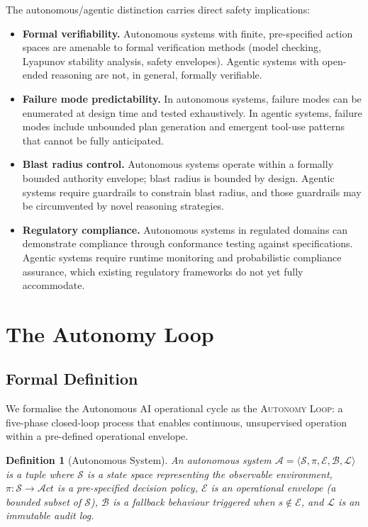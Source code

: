 \documentclass[12pt, a4paper]{article}
\newtheorem{definition}{Definition}
\begin{document}
The autonomous/agentic distinction carries direct safety implications:

\begin{itemize}
    \item \textbf{Formal verifiability.} Autonomous systems with finite, pre-specified action spaces are amenable to formal verification methods (model checking, Lyapunov stability analysis, safety envelopes). Agentic systems with open-ended reasoning are not, in general, formally verifiable.
    \item \textbf{Failure mode predictability.} In autonomous systems, failure modes can be enumerated at design time and tested exhaustively. In agentic systems, failure modes include unbounded plan generation and emergent tool-use patterns that cannot be fully anticipated.
    \item \textbf{Blast radius control.} Autonomous systems operate within a formally bounded authority envelope; blast radius is bounded by design. Agentic systems require guardrails to constrain blast radius, and those guardrails may be circumvented by novel reasoning strategies.
    \item \textbf{Regulatory compliance.} Autonomous systems in regulated domains can demonstrate compliance through conformance testing against specifications. Agentic systems require runtime monitoring and probabilistic compliance assurance, which existing regulatory frameworks do not yet fully accommodate.
\end{itemize}

\section{The Autonomy Loop}\label{sec:loop}

\subsection{Formal Definition}

We formalise the Autonomous AI operational cycle as the \textsc{Autonomy Loop}: a five-phase closed-loop process that enables continuous, unsupervised operation within a pre-defined operational envelope.

\begin{definition}[Autonomous System]
An autonomous system $\mathcal{A} = \langle \mathcal{S}, \pi, \mathcal{E}, \mathcal{B}, \mathcal{L} \rangle$ is a tuple where $\mathcal{S}$ is a state space representing the observable environment, $\pi: \mathcal{S} \rightarrow \mathcal{A}ct$ is a pre-specified decision policy, $\mathcal{E}$ is an operational envelope (a bounded subset of $\mathcal{S}$), $\mathcal{B}$ is a fallback behaviour triggered when $s \notin \mathcal{E}$, and $\mathcal{L}$ is an immutable audit log.
\end{definition}
\end{document}
